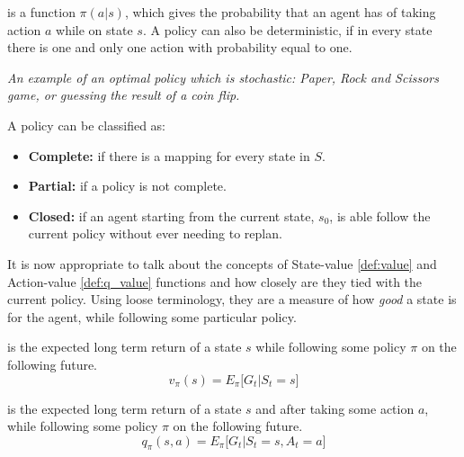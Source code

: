 \begin{definition}[Policy] is a function $\pi(a|s)$, which gives the probability
      that an agent has of taking action $a$ while on state $s$. A policy can
      also be deterministic, if in every state there is one and only one action
      with probability equal to one.

      \textit{An example of an optimal policy which is stochastic: Paper, Rock
      and Scissors game, or guessing the result of a coin flip.}

      A policy can be classified as:
      \begin{itemize}
        \item \textbf{Complete: } if there is a mapping for every state in $S$.
        \item \textbf{Partial: } if a policy is not complete.
        \item \textbf{Closed: } if an agent starting from the current state, $s_0$,
        is able follow the current policy without ever needing to replan.

      \end{itemize}

      \label{def:policy}
\end{definition}

It is now appropriate to talk about the concepts of State-value \ref{def:value}
and Action-value \ref{def:q_value} functions and how closely are they tied with
the current policy. Using loose terminology, they are a measure of how
\textit{good} a state is for the agent, while following some particular policy.

\begin{definition} is the expected long term return of a
    state $s$ while following some policy $\pi$ on the following future.
    \begin{equation}
        v_{\pi}(s) = E_{\pi}\Big[ G_t | S_t = s \Big]
    \end{equation}
    \label{def:value}
\end{definition}

\begin{definition} is the expected long term return of a
    state $s$ and after taking some action $a$, while following some policy
    $\pi$ on the following future.
    \begin{equation}
        q_{\pi}(s, a) = E_{\pi}\Big[ G_t | S_t = s, A_t = a \Big]
    \end{equation}
    \label{def:q_value}
\end{definition}


